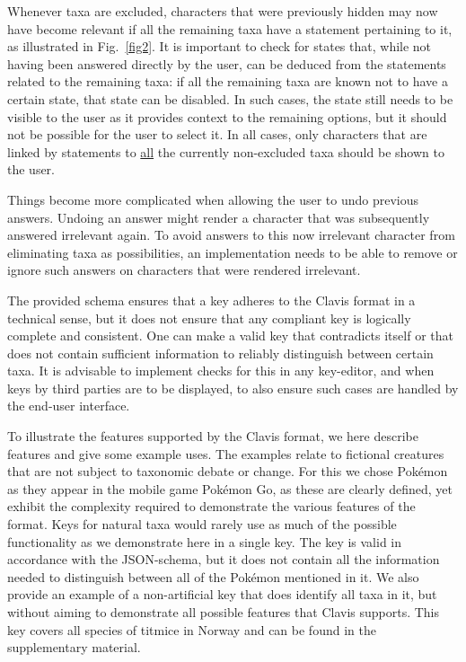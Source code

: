 \documentclass[10pt,letterpaper]{article}
\begin{document}
Whenever taxa are excluded, characters that were previously hidden may now have become relevant if all the remaining taxa have a statement pertaining to it, as illustrated in Fig.~\ref{fig2}. It is important to check for states that, while not having been answered directly by the user, can be deduced from the statements related to the remaining taxa: if all the remaining taxa are known not to have a certain state, that state can be disabled. In such cases, the state still needs to be visible to the user as it provides context to the remaining options, but it should not be possible for the user to select it. In all cases, only characters that are linked by statements to \underline{all} the currently non-excluded taxa should be shown to the user.

Things become more complicated when allowing the user to undo previous answers. Undoing an answer might render a character that was subsequently answered irrelevant again. To avoid answers to this now irrelevant character from eliminating taxa as possibilities, an implementation needs to be able to remove or ignore such answers on characters that were rendered irrelevant.

The provided schema ensures that a key adheres to the Clavis format in a technical sense, but it does not ensure that any compliant key is logically complete and consistent. One can make a valid key that contradicts itself or that does not contain sufficient information to reliably distinguish between certain taxa. It is advisable to implement checks for this in any key-editor, and when keys by third parties are to be displayed, to also ensure such cases are handled by the end-user interface.

To illustrate the features supported by the Clavis format, we here describe features and give some example uses. The examples relate to fictional creatures that are not subject to taxonomic debate or change. For this we chose Pokémon as they appear in the mobile game Pokémon Go, as these are clearly defined, yet exhibit the complexity required to demonstrate the various features of the format. Keys for natural taxa would rarely use as much of the possible functionality as we demonstrate here in a single key. The key is valid in accordance with the JSON-schema, but it does not contain all the information needed to distinguish between all of the Pokémon mentioned in it. We also provide an example of a non-artificial key that does identify all taxa in it, but without aiming to demonstrate all possible features that Clavis supports. This key covers all species of titmice in Norway and can be found in the supplementary material.
\end{document}
